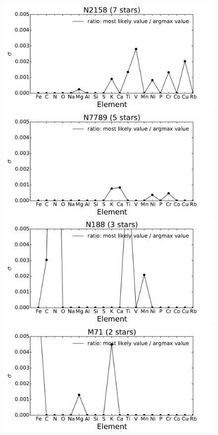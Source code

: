 \documentclass[14pt, preprint2]{aastex6}
\begin{document}
\begin{figure}
  \includegraphics[scale=0.4]{N2158_ratio.pdf}
   \includegraphics[scale=0.4]{N7789_ratio.pdf} \\
     \includegraphics[scale=0.4]{N188_ratio.pdf}
   \includegraphics[scale=0.4]{M71_ratio.pdf}\\
  \caption{  } %
\label{fig:c3}
\end{figure}
\end{document}
